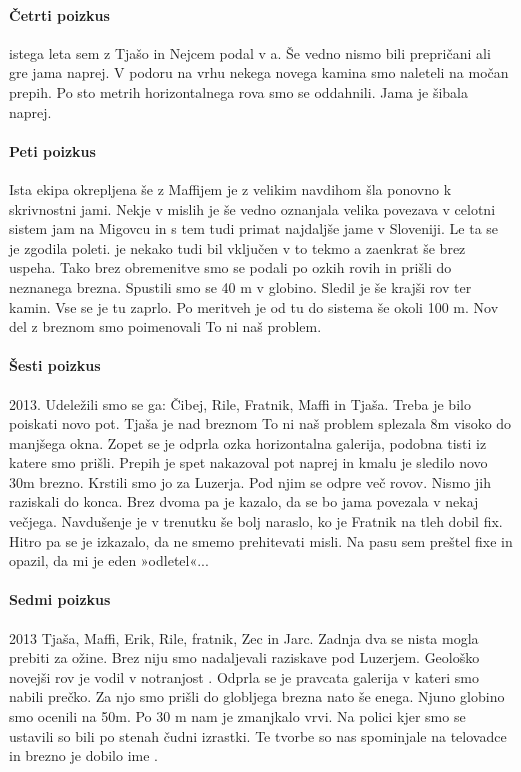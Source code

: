 \paragraph{Četrti poizkus} istega leta sem z Tjašo in Nejcem podal v a. Še vedno nismo bili prepričani ali gre jama naprej. V podoru na vrhu nekega novega kamina smo naleteli na močan prepih. Po sto metrih horizontalnega rova smo se oddahnili. Jama je šibala naprej. 

\paragraph{Peti poizkus} Ista ekipa okrepljena še z Maffijem je z velikim navdihom šla ponovno k skrivnostni jami. Nekje v mislih je še vedno oznanjala velika povezava v celotni sistem jam na Migovcu in s tem tudi primat najdaljše jame v Sloveniji. Le ta se je zgodila  poleti.  je nekako tudi bil vključen v to tekmo a zaenkrat še brez uspeha. Tako brez obremenitve smo se podali po ozkih rovih in prišli do neznanega brezna.  Spustili smo se 40 m v globino. Sledil je še krajši rov ter kamin. Vse se je tu zaprlo. Po meritveh je od tu do sistema še okoli 100 m. Nov del z breznom smo poimenovali To ni naš problem. 

\paragraph{Šesti poizkus} 2013. Udeležili smo se ga: Čibej, Rile, Fratnik, Maffi in Tjaša. Treba je bilo poiskati novo pot. Tjaša je nad breznom To ni naš problem splezala 8m visoko do manjšega okna. Zopet se je odprla ozka horizontalna galerija, podobna tisti iz katere smo prišli. Prepih je spet nakazoval pot naprej in kmalu je sledilo novo 30m brezno. Krstili smo jo za Luzerja. Pod njim se odpre več rovov. Nismo jih raziskali do konca. Brez dvoma pa je kazalo, da se bo jama povezala v nekaj večjega. Navdušenje je v trenutku še bolj naraslo, ko je Fratnik na tleh dobil fix. Hitro pa se je izkazalo, da ne smemo prehitevati misli. Na pasu sem preštel  fixe  in opazil, da  mi je eden »odletel«... 

\paragraph{Sedmi poizkus} 2013 Tjaša, Maffi, Erik, Rile, fratnik, Zec in Jarc. Zadnja dva se nista mogla prebiti za ožine. Brez niju smo nadaljevali raziskave pod Luzerjem. Geološko novejši rov je vodil v notranjost . Odprla se je pravcata galerija v kateri smo nabili prečko. Za njo smo prišli do globljega brezna nato še enega. Njuno globino smo ocenili na 50m. Po 30 m nam je zmanjkalo vrvi. Na polici kjer smo se ustavili so bili po stenah čudni izrastki. Te tvorbe so nas spominjale na telovadce in brezno je dobilo ime .

